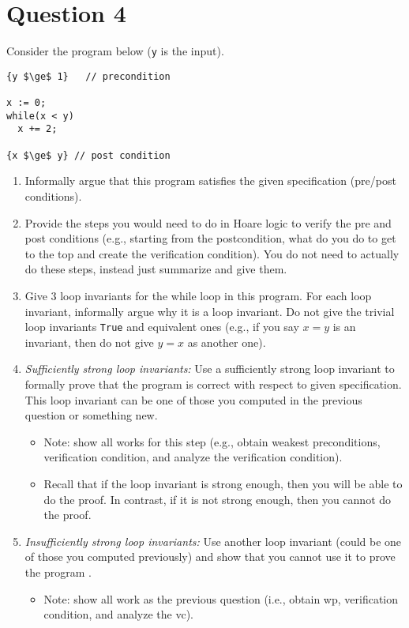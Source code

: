 \documentclass[10pt]{article}
\begin{document}
\newpage
\section{Question 4}

Consider the program below (\texttt{y} is the input). 
\begin{lstlisting}
{y $\ge$ 1}   // precondition

x := 0;
while(x < y)
  x += 2;

{x $\ge$ y} // post condition
\end{lstlisting}


\begin{enumerate}
\item Informally argue that this program satisfies the given specification (pre/post conditions).
\item Provide the steps you would need to do in Hoare logic to verify the pre and post conditions (e.g., starting from the postcondition, what do you do to get to the top and create the verification condition). You do not need to actually do these steps, instead just summarize and give them.
  
\item Give 3 loop invariants for the while loop in this program. For each loop invariant, informally argue why it is a loop invariant.  Do not give the trivial loop invariants \texttt{True} and equivalent ones (e.g., if you say $x = y$ is an invariant, then do not give $y = x$ as another one).
  
\item \emph{Sufficiently strong loop invariants:}  Use a sufficiently strong loop invariant to formally prove that the program is correct with respect to given specification. This loop invariant can be one of those you computed in the previous question or something new.
  \begin{itemize}
    \item Note: show all works for this step (e.g., obtain weakest preconditions, verification condition, and analyze the verification condition).
  \item Recall that if the loop invariant is strong enough, then you will be able to do the proof. In contrast, if it is not strong enough, then you cannot do the proof.
  \end{itemize}
\item \emph{Insufficiently strong loop invariants:} Use another loop invariant (could be one of those you computed previously) and show that you cannot use it to prove the program . 
  \begin{itemize}
    \item Note: show all work as the previous question (i.e., obtain wp, verification condition, and analyze the vc).
    \end{itemize}


\end{enumerate}
\end{document}
